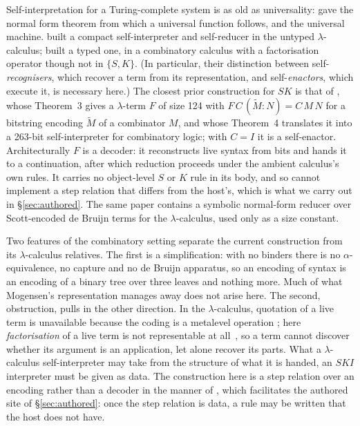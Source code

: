 \documentclass[review]{jfp-epi}
\begin{document}
Self-interpretation for a Turing-complete system is as old as
universality: \citet{Kleene1936} gave the normal form theorem from which
a universal function follows, and \citet{Turing1936} the universal
machine. \citet{Mogensen1992} built a compact self-interpreter and
self-reducer in the untyped $\lambda$-calculus; \citet{JayPalsberg2011}
built a typed one, in a combinatory calculus with a factorisation
operator though not in $\{S,K\}$. (In particular, their distinction
between self-\emph{recognisers}, which recover a term from its
representation, and self-\emph{enactors}, which execute it, is
necessary here.) The closest prior construction for $SK$ is that of
\citet{Tromp2006}, whose Theorem~3 gives a $\lambda$-term $F$ of size
124 with $F\,C\,(\tilde M : N) = C\,M\,N$ for a bitstring encoding
$\tilde M$ of a combinator $M$, and whose Theorem~4 translates it into
a 263-bit self-interpreter for combinatory logic; with $C = I$ it is a
self-enactor. Architecturally $F$ is a decoder: it reconstructs live
syntax from bits and hands it to a continuation, after which reduction
proceeds under the ambient calculus's own rules. It carries no
object-level $S$ or $K$ rule in its body, and so cannot implement a step
relation that differs from the host's, which is what we carry out in
\S\ref{sec:authored}. The same paper contains a
symbolic normal-form reducer over Scott-encoded de Bruijn terms for the
$\lambda$-calculus, used only as a size constant.

Two features of the combinatory setting separate the current construction
from its $\lambda$-calculus relatives.
The first is a simplification: with no binders there is no
$\alpha$-equivalence, no capture and no de Bruijn apparatus, so an
encoding of syntax is an encoding of a binary tree over three leaves and
nothing more.  Much of what Mogensen's representation manages away does
not arise here.  The second, obstruction, pulls in the other direction.
In the $\lambda$-calculus, quotation of a live term is
unavailable because the coding is a metalevel operation
\citep{Barendregt1991}; here
\emph{factorisation} of a live term is not representable at
all~\mbox{\citep{JayGivenWilson2011}}, so a term cannot discover whether its
argument is an application, let alone recover its parts.  What a
$\lambda$-calculus self-interpreter may take from the structure of what
it is handed, an $SKI$ interpreter must be given as data.
The construction here is a step relation over an encoding rather than a
decoder in the manner of \citet{Tromp2006}, which facilitates the
authored site of \S\ref{sec:authored}: once the step relation
is data, a rule may be written that the host does not have.
\end{document}
